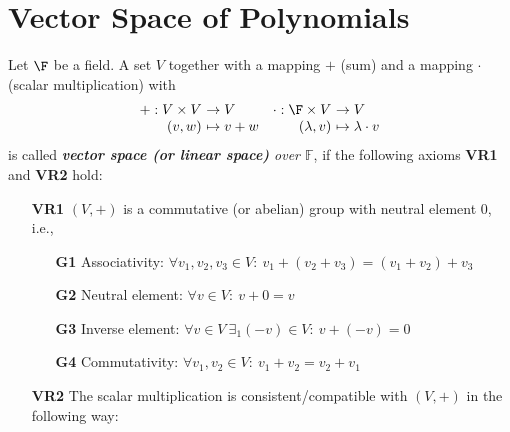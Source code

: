 \section{Vector Space of Polynomials}
{\color{navy}
Let $\F$ be a field. A set $V$ together with a mapping $+$ 
(sum) and a mapping $\cdot$ (scalar multiplication) with 
\begin{eqnarray*} \begin{array}{r@{~}lr@{~}l} 
		+: V \times V & \to V & \cdot : \F \times V & \to V \\ 
		(v,w)       & \mapsto v+ w    & (\lambda, v) & \mapsto \lambda \cdot v  
\end{array} \end{eqnarray*} 
is called \emph{\textbf{vector space (or linear space)} over $\mathbb{F}$}, if the following axioms \textbf{VR1} and \textbf{VR2} hold: 

\begin{itemize} 
	\item[\textbf{VR1}] $(V,+)$ is a commutative (or abelian) group with neutral element $0$, i.e., 
	\begin{itemize}
		\item[\textbf{G1}]Associativity: $\forall v_1, v_2,v_3\in V:~ v_1+(v_2+v_3)=(v_1+v_2)+v_3$
		\item[\textbf{G2}] Neutral element: $\forall v \in V: ~v + 0 = v$
		\item[\textbf{G3}] Inverse element: $\forall v \in V ~\exists_1 (-v) \in V:~ v+(-v)=0$
		\item[\textbf{G4}] Commutativity: $\forall v_1, v_2 \in V:~ v_1 + v_2 = v_2+v_1$
	\end{itemize}
	\item[\textbf{VR2}] The scalar multiplication is consistent/compatible with 
	$(V,+)$ in the following way:  
	

\end{itemize}}
